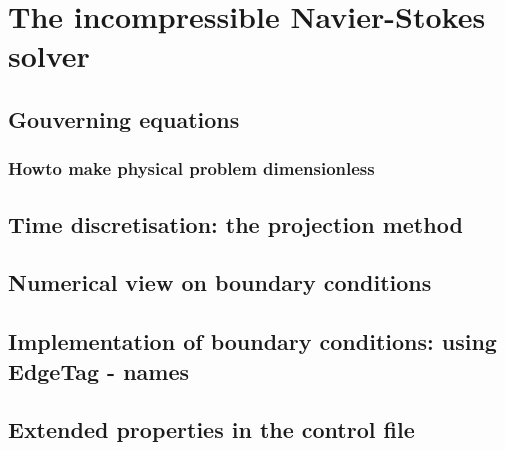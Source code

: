 \section{The incompressible Navier-Stokes solver}

\subsection{Gouverning equations}

\subsubsection*{Howto make physical problem dimensionless}

\subsection{Time discretisation: the projection method}

\subsection{Numerical view on boundary conditions}

\subsection{Implementation of boundary conditions: using EdgeTag - names}

\subsection{Extended properties in the control file}

